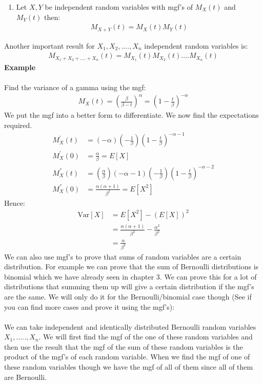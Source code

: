 \documentclass[,oneside]{article}
\begin{document}
\begin{enumerate}
\begin{enumerate}
\item Let $X,Y$ be independent random variables with mgf's of $M_X(t)$ and $M_Y(t)$ then:
\begin{align*}
M_{X+Y}(t)=M_X(t)M_Y(t)
\end{align*}
\end{enumerate}
Another important result for $X_1, X_2,....,X_n$ independent random variables is:
\begin{align*}
M_{X_1+X_2+....+X_n}(t)=M_{X_1}(t)M_{X_2}(t)....M_{X_n}(t)
\end{align*}
\textbf{Example}\\ \\
Find the variance of a gamma using the mgf:\\
\begin{align*}
M_X(t)=\left (\frac{\beta}{\beta-t} \right )^{\alpha} = \left (1-\frac{t}{\beta} \right )^{-\alpha}
\end{align*}
We put the mgf into a better form to differentiate. We now find the expectations required.
\begin{align*}
M_X^{'}(t)&=(-\alpha) \left ( -\frac{1}{\beta} \right )  \left (1-\frac{t}{\beta} \right )^{-\alpha-1}\\
M_X^{'}(0)&= \frac{\alpha}{\beta}=E[X]\\
M_X^{''}(t)&=\left (\frac{\alpha}{\beta} \right ) (-\alpha -1 ) \left ( -\frac{1}{\beta} \right )  \left (1-\frac{t}{\beta} \right )^{-\alpha-2}\\
M_X^{''}(0)&= \frac{\alpha (\alpha +1)}{\beta^2}=E[X^2]
\end{align*}
Hence:
\begin{align*}
\text{Var}[X]&=E[X^2]-(E[X])^2 \\
&= \frac{\alpha (\alpha +1)}{\beta^2} - \frac{\alpha^2}{\beta^2}\\
&=\frac{\alpha}{\beta^2}
\end{align*}
We can also use mgf's to prove that sums of random variables are a certain distribution. For example we can prove that the sum of Bernoulli distributions is binomial which we have already seen in chapter 3. We can prove this for a lot of distributions that summing them up will give a certain distribution if the mgf's are the same. We will only do it for the Bernoulli/binomial case though (See if you can find more cases and prove it using the mgf's):\\ \\
We can take independent and identically distributed Bernoulli random variables $X_1,.....,X_n$. We will first find the mgf of the one of these random variables and then use the result that the mgf of the sum of these random variables is the product of the mgf's of each random variable. When we find the mgf of one of these random variables though we have the mgf of all of them since all of them are Bernoulli.

\end{enumerate}
\end{document}
